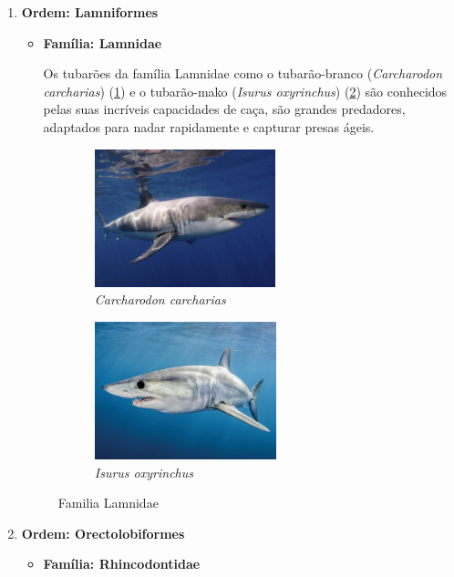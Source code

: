 \documentclass{report}
\begin{document}
\begin{enumerate}
	\item \textbf{Ordem: Lamniformes}
	\begin{itemize}
		\item \textbf{Família: Lamnidae}
		
Os tubarões da família Lamnidae como o tubarão-branco (\textit{Carcharodon carcharias}) (\ref{fig:tubaraobranco}) e o tubarão-mako (\textit{Isurus oxyrinchus}) (\ref{fig:tubaraomako}) são conhecidos pelas suas incríveis capacidades de caça, são grandes predadores, adaptados para nadar rapidamente e capturar presas ágeis.
	\end{itemize}
	
	\begin{figure}[H]
	\center
    		\begin{subfigure}{.5\textwidth}
    		\center
        		\includegraphics[height=4cm]{imagens/tubaraobranco.jpg}
        		\caption{\textit{Carcharodon carcharias}}
        		\label{fig:tubaraobranco}
    		\end{subfigure}%
   		\begin{subfigure}{.5\textwidth}
    		\center
        		\includegraphics[height=4cm]{imagens/tubaraomako.jpg}
        		\caption{\textit{Isurus oxyrinchus}}
       	 	\label{fig:tubaraomako}
    		\end{subfigure}
    		\caption{Familia Lamnidae}
    		\label{fig:lamnidae}
	\end{figure}
	
	\item \textbf{Ordem: Orectolobiformes}
	\begin{itemize}
		\item \textbf{Família: Rhincodontidae}
		

\end{itemize}
\end{enumerate}
\end{document}
